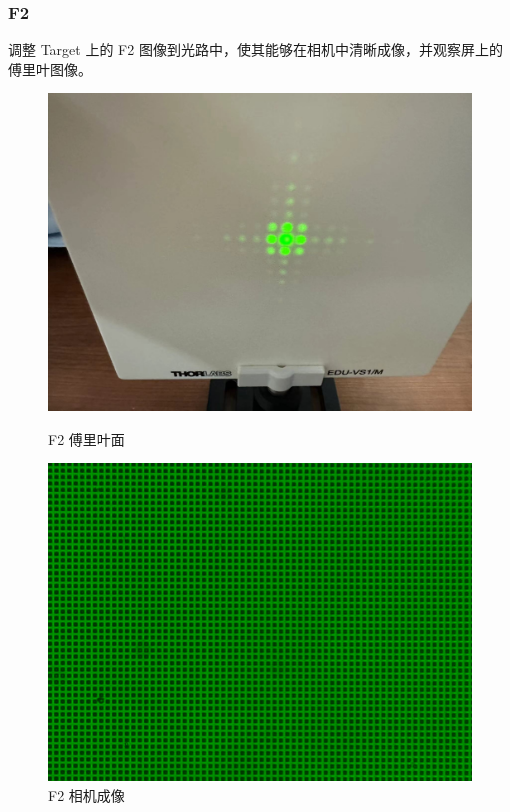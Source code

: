 \documentclass{ctexart}
\begin{document}
\subsubsection{F2}
调整 Target 上的 F2 图像到光路中，使其能够在相机中清晰成像，并观察屏上的傅里叶图像。
\begin{figure}[H]
  \centering
  \begin{minipage}[b]{0.2\textwidth}
    \centering
    \includegraphics[width=\textwidth]{pictures/微信图片_20241010201054.jpg}
    \caption{F2 傅里叶面}
  \end{minipage}
  \hspace{0.1\textwidth} %
  \begin{minipage}[b]{0.3\textwidth}
    \centering
    \includegraphics[width=\textwidth]{pictures/F2-nomask.png}
    \caption{F2 相机成像}
  \end{minipage}
\end{figure}
\end{document}
